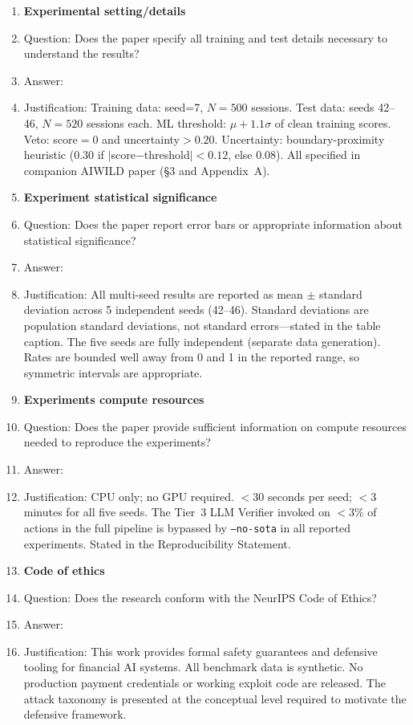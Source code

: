 \begin{enumerate}
\item {\bf Experimental setting/details}
    \item[] Question: Does the paper specify all training and test details necessary to understand the results?
    \item[] Answer: \answerYes{}
    \item[] Justification: Training data: seed=7, $N=500$ sessions. Test data: seeds 42--46, $N=520$ sessions each. ML threshold: $\mu + 1.1\sigma$ of clean training scores. Veto: score$=0$ and uncertainty$>0.20$. Uncertainty: boundary-proximity heuristic (0.30 if $|$score$-$threshold$|<0.12$, else 0.08). All specified in companion AIWILD paper (\S3 and Appendix~A).

\item {\bf Experiment statistical significance}
    \item[] Question: Does the paper report error bars or appropriate information about statistical significance?
    \item[] Answer: \answerYes{}
    \item[] Justification: All multi-seed results are reported as mean $\pm$ standard deviation across 5 independent seeds (42--46). Standard deviations are population standard deviations, not standard errors---stated in the table caption. The five seeds are fully independent (separate data generation). Rates are bounded well away from 0 and 1 in the reported range, so symmetric intervals are appropriate.

\item {\bf Experiments compute resources}
    \item[] Question: Does the paper provide sufficient information on compute resources needed to reproduce the experiments?
    \item[] Answer: \answerYes{}
    \item[] Justification: CPU only; no GPU required. $<$30 seconds per seed; $<$3 minutes for all five seeds. The Tier~3 LLM Verifier invoked on $<$3\% of actions in the full pipeline is bypassed by \texttt{--no-sota} in all reported experiments. Stated in the Reproducibility Statement.

\item {\bf Code of ethics}
    \item[] Question: Does the research conform with the NeurIPS Code of Ethics?
    \item[] Answer: \answerYes{}
    \item[] Justification: This work provides formal safety guarantees and defensive tooling for financial AI systems. All benchmark data is synthetic. No production payment credentials or working exploit code are released. The attack taxonomy is presented at the conceptual level required to motivate the defensive framework.


\end{enumerate}
